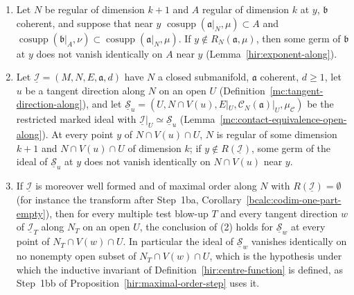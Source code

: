 \begin{proposition}
\label{bcalc:contact-restriction-nonzero}
\mixedleanok
\begin{enumerate}
\item Let \(N\) be regular of dimension \(k+1\) and \(A\) regular of dimension \(k\) at \(y\), \(\mathfrak b\) coherent, and suppose that near \(y\)
\(\operatorname{cosupp}(\mathfrak a|_N,\mu)\subset A\) and \(\operatorname{cosupp}(\mathfrak b|_A,\nu)\subset\operatorname{cosupp}(\mathfrak a|_N,\mu)\). If \(y\notin R_N(\mathfrak a,\mu)\),
then some germ of \(\mathfrak b\) at \(y\) does not vanish identically on \(A\) near \(y\) (Lemma~\ref{hir:exponent-along}).
\item Let \(\underline{\mathcal I}=(M,N,E,\mathfrak a,d)\) have \(N\) a closed submanifold, \(\mathfrak a\) coherent, \(d\ge1\), let \(u\) be a tangent direction along \(N\) on an
open \(U\) (Definition~\ref{mc:tangent-direction-along}), and let \(\underline{\mathcal S}_u=(U,N\cap V(u),E|_U,\mathcal C_N(\mathfrak a)|_U,\mu_{\mathcal C})\) be the restricted
marked ideal with \(\underline{\mathcal I}|_U\simeq\underline{\mathcal S}_u\) (Lemma~\ref{mc:contact-equivalence-open-along}). At every point \(y\) of \(N\cap V(u)\cap U\), \(N\) is
regular of some dimension \(k+1\) and \(N\cap V(u)\cap U\) of dimension \(k\); if \(y\notin R(\underline{\mathcal I})\), some germ of the ideal of \(\underline{\mathcal S}_u\) at \(y\)
does not vanish identically on \(N\cap V(u)\) near \(y\).
\item If \(\underline{\mathcal I}\) is moreover well formed and of maximal order along \(N\) with \(R(\underline{\mathcal I})=\emptyset\) (for instance the transform after
Step~1ba, Corollary~\ref{bcalc:codim-one-part-empty}), then for every multiple test blow-up \(T\) and every tangent direction \(w\) of \(\underline{\mathcal I}_T\) along \(N_T\) on
an open \(U\), the conclusion of (2) holds for \(\underline{\mathcal S}_w\) at every point of \(N_T\cap V(w)\cap U\). In particular the ideal of \(\underline{\mathcal S}_w\)
vanishes identically on no nonempty open subset of \(N_T\cap V(w)\cap U\), which is the hypothesis under which the inductive invariant of
Definition~\ref{hir:centre-function} is defined, as Step~1bb of Proposition~\ref{hir:maximal-order-step} uses it.
\end{enumerate}
\end{proposition}
